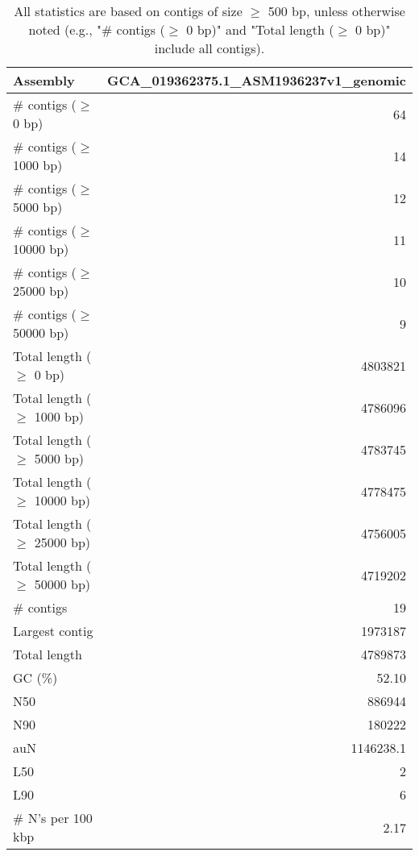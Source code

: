 \documentclass[12pt,a4paper]{article}
\begin{document}
\begin{table}[ht]
\begin{center}
\caption{All statistics are based on contigs of size $\geq$ 500 bp, unless otherwise noted (e.g., "\# contigs ($\geq$ 0 bp)" and "Total length ($\geq$ 0 bp)" include all contigs).}
\begin{tabular}{|l*{1}{|r}|}
\hline
Assembly & GCA\_019362375.1\_ASM1936237v1\_genomic \\ \hline
\# contigs ($\geq$ 0 bp) & 64 \\ \hline
\# contigs ($\geq$ 1000 bp) & 14 \\ \hline
\# contigs ($\geq$ 5000 bp) & 12 \\ \hline
\# contigs ($\geq$ 10000 bp) & 11 \\ \hline
\# contigs ($\geq$ 25000 bp) & 10 \\ \hline
\# contigs ($\geq$ 50000 bp) & 9 \\ \hline
Total length ($\geq$ 0 bp) & 4803821 \\ \hline
Total length ($\geq$ 1000 bp) & 4786096 \\ \hline
Total length ($\geq$ 5000 bp) & 4783745 \\ \hline
Total length ($\geq$ 10000 bp) & 4778475 \\ \hline
Total length ($\geq$ 25000 bp) & 4756005 \\ \hline
Total length ($\geq$ 50000 bp) & 4719202 \\ \hline
\# contigs & 19 \\ \hline
Largest contig & 1973187 \\ \hline
Total length & 4789873 \\ \hline
GC (\%) & 52.10 \\ \hline
N50 & 886944 \\ \hline
N90 & 180222 \\ \hline
auN & 1146238.1 \\ \hline
L50 & 2 \\ \hline
L90 & 6 \\ \hline
\# N's per 100 kbp & 2.17 \\ \hline
\end{tabular}
\end{center}
\end{table}
\end{document}
